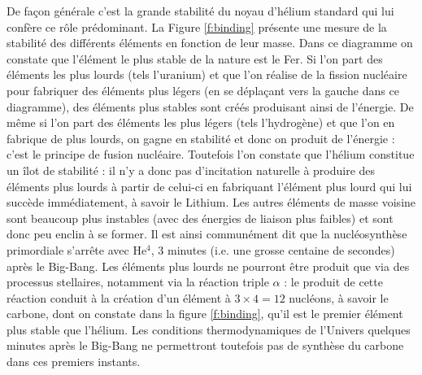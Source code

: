 De façon générale c'est la grande stabilité du noyau d'hélium standard qui lui confère ce rôle prédominant. La Figure \ref{f:binding} présente une mesure de la stabilité des différents éléments en fonction de leur masse. Dans ce diagramme on constate que l'élément le plus stable de la nature est le Fer. Si l'on part des éléments les plus lourds (tels l'uranium) et que l'on réalise de la fission nucléaire pour fabriquer des éléments plus légers (en se déplaçant vers la gauche dans ce diagramme), des éléments plus stables sont créés produisant ainsi de l'énergie. De même si l'on part des éléments les plus légers (tels l'hydrogène) et que l'on en fabrique de plus lourds, on gagne en stabilité et donc on produit de l'énergie : c'est le principe de fusion nucléaire. Toutefois l'on constate que l'hélium constitue un îlot de stabilité : il n'y a donc pas d'incitation naturelle à produire des éléments plus lourds à partir de celui-ci en fabriquant l'élément plus lourd qui lui succède immédiatement, à savoir le Lithium. Les autres éléments de masse voisine sont beaucoup plus instables (avec des énergies de liaison plus faibles) et sont donc peu enclin à se former. Il est ainsi communément dit que la nucléosynthèse primordiale s'arrête avec He$^4$, 3 minutes (i.e. une grosse centaine de secondes) après le Big-Bang. Les éléments plus lourds ne pourront être produit que via des processus stellaires, notamment via la réaction triple $\alpha$ :  le produit de cette réaction conduit à la création d'un élément à $3\times 4= 12$ nucléons, à savoir le carbone, dont on constate dans la figure \ref{f:binding}, qu'il est le premier élément plus stable que l'hélium. Les conditions thermodynamiques de l'Univers quelques minutes après le Big-Bang ne permettront toutefois pas de synthèse du carbone dans ces premiers instants.

